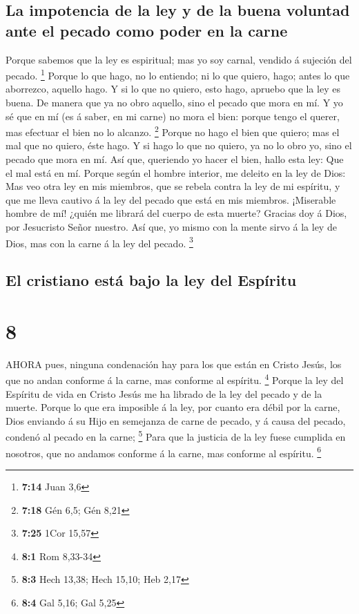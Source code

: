 \hypertarget{la-impotencia-de-la-ley-y-de-la-buena-voluntad-ante-el-pecado-como-poder-en-la-carne}{%
\subsection{La impotencia de la ley y de la buena voluntad ante el
pecado como poder en la
carne}\label{la-impotencia-de-la-ley-y-de-la-buena-voluntad-ante-el-pecado-como-poder-en-la-carne}}

 Porque sabemos que la ley es espiritual; mas yo soy
carnal, vendido á sujeción del pecado. \footnote{\textbf{7:14} Juan 3,6}
 Porque lo que hago, no lo entiendo; ni lo que quiero,
hago; antes lo que aborrezco, aquello hago.  Y si lo que no
quiero, esto hago, apruebo que la ley es buena.  De manera
que ya no obro aquello, sino el pecado que mora en mí.  Y
yo sé que en mí (es á saber, en mi carne) no mora el bien: porque tengo
el querer, mas efectuar el bien no lo alcanzo. \footnote{\textbf{7:18}
  Gén 6,5; Gén 8,21}  Porque no hago el bien que quiero;
mas el mal que no quiero, éste hago.  Y si hago lo que no
quiero, ya no lo obro yo, sino el pecado que mora en mí. 
Así que, queriendo yo hacer el bien, hallo esta ley: Que el mal está en
mí.  Porque según el hombre interior, me deleito en la ley
de Dios:  Mas veo otra ley en mis miembros, que se rebela
contra la ley de mi espíritu, y que me lleva cautivo á la ley del pecado
que está en mis miembros.  ¡Miserable hombre de mí! ¿quién
me librará del cuerpo de esta muerte?  Gracias doy á Dios,
por Jesucristo Señor nuestro. Así que, yo mismo con la mente sirvo á la
ley de Dios, mas con la carne á la ley del pecado. \footnote{\textbf{7:25}
  1Cor 15,57}

\hypertarget{el-cristiano-estuxe1-bajo-la-ley-del-espuxedritu}{%
\subsection{El cristiano está bajo la ley del
Espíritu}\label{el-cristiano-estuxe1-bajo-la-ley-del-espuxedritu}}

\hypertarget{section-7}{%
\section{8}\label{section-7}}

 AHORA pues, ninguna condenación hay para los que están en
Cristo Jesús, los que no andan conforme á la carne, mas conforme al
espíritu. \footnote{\textbf{8:1} Rom 8,33-34}  Porque la ley
del Espíritu de vida en Cristo Jesús me ha librado de la ley del pecado
y de la muerte.  Porque lo que era imposible á la ley, por
cuanto era débil por la carne, Dios enviando á su Hijo en semejanza de
carne de pecado, y á causa del pecado, condenó al pecado en la carne;
\footnote{\textbf{8:3} Hech 13,38; Hech 15,10; Heb 2,17} 
Para que la justicia de la ley fuese cumplida en nosotros, que no
andamos conforme á la carne, mas conforme al espíritu. \footnote{\textbf{8:4}
  Gal 5,16; Gal 5,25}

